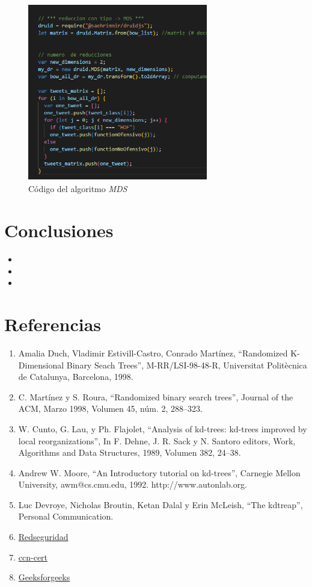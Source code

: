 \documentclass{article}
\begin{document}
\begin{figure}[h!]
	\centering
	\includegraphics[width=0.7\textwidth]{img/mds.png}
	\caption{Código del algoritmo \textit{MDS}}
	\label{fig:mds}
\end{figure}

\clearpage
\section{Conclusiones}
\begin{itemize}
	\item 
	\item 
	\item 
\end{itemize}

\section{Referencias}
\begin{enumerate}
	\item Amalia Duch, Vladimir Estivill-Castro, Conrado Martínez, “Randomized K-Dimensional Binary Seach Trees”, M-RR/LSI-98-48-R, Universitat Politècnica de Catalunya, Barcelona, 1998.
	\item C. Martínez y S. Roura, “Randomized binary search trees”, Journal of the ACM, Marzo 1998, Volumen 45, núm. 2, 288$–$323.
	\item W. Cunto, G. Lau, y Ph. Flajolet, “Analysis of kd-trees: kd-trees improved by local reorganizations”, In F. Dehne, J. R. Sack y N. Santoro editors, Work, Algorithms and Data Structures, 1989, Volumen 382, 24$–$38.
	\item Andrew W. Moore, “An Introductory tutorial on kd-trees”, Carnegie Mellon University, awm@cs.cmu.edu, 1992. http://www.autonlab.org.
	\item Luc Devroye, Nicholas Broutin, Ketan Dalal y Erin McLeish, “The kdtreap”, Personal Communication.
	\item \href{https://www.redseguridad.com/revistas/red/095/58/index.html}{Redseguridad}
	\item \href{https://www.ccn-cert.cni.es/informes/informes-ccn-cert-publicos/5377-ccn-cert-ia-13-20-ciberamenazas-y-tendencias-edicion-2020/file.html}{ccn-cert}
	\item \href{https://www.geeksforgeeks.org/}{Geeksforgeeks}
\end{enumerate}
\end{document}
